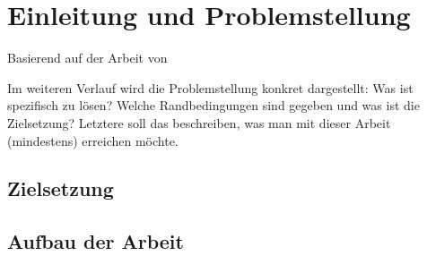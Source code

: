 \chapter{Einleitung und Problemstellung}



Basierend auf der Arbeit  von \citeauthor{gasperini:hal-03209144} 

Im weiteren Verlauf wird die Problemstellung konkret dargestellt: Was ist spezifisch zu lösen? Welche Randbedingungen sind gegeben und was ist die Zielsetzung? Letztere soll das beschreiben, was man mit dieser Arbeit (mindestens) erreichen möchte.



\section{Zielsetzung}

\section{Aufbau der Arbeit}